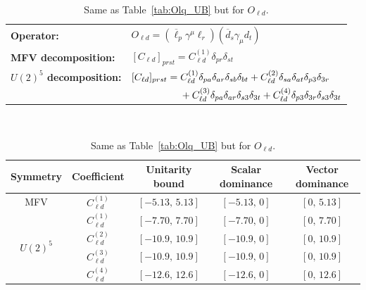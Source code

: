 \begin{table}[htbp]
\centering
{\small
\begin{tabular}{ll}
    \textbf{Operator:} &
        $\boxed{O_{\ell d} = (\overline\ell_p \gamma^\mu \ell_r)(\overline d_s \gamma_\mu d_t)}$ \\[0.2cm]
    \textbf{MFV decomposition:} &
        $[C_{\ell d}]_{prst} = C_{\ell d}^{(1)}\delta_{pr}\delta_{st}$ \\[0.15cm]
    \textbf{$U(2)^5$ decomposition:} &
        $[C_{\ell d}]_{prst} =
            C_{\ell d}^{(1)}\Pij{p}{r}{a}\Pij{s}{t}{b}
            + C_{\ell d}^{(2)}\Pij{s}{t}{a}\delta_{p3}\delta_{3r}$ \\
        & $\phantom{[C_{\ell d}]_{prst} ={}}+ C_{\ell d}^{(3)}\Pij{p}{r}{a}\delta_{s3}\delta_{3t}
            + C_{\ell d}^{(4)}\delta_{p3}\delta_{3r}\delta_{s3}\delta_{3t}$ \\
\end{tabular}
\\[0.3cm]
\renewcommand{\arraystretch}{1.3}
\begin{tabular}{ccccc}
    \toprule
    \rowcolor{hdrcolor}
    \textbf{Symmetry} & \textbf{Coefficient}
        & \textbf{Unitarity bound}
        & \textbf{Scalar dominance}
        & \textbf{Vector dominance} \\
    \midrule
    \multirow{1}{*}{MFV}
        & $C_{\ell d}^{(1)}$ & $[-5.13,\, 5.13]$ & $[-5.13,\, 0]$ & $[0,\, 5.13]$ \\
    \midrule
    \multirow{4}{*}{$U(2)^5$}
        & $C_{\ell d}^{(1)}$ & $[-7.70,\, 7.70]$ & $[-7.70,\, 0]$ & $[0,\, 7.70]$ \\
        & $C_{\ell d}^{(2)}$ & $[-10.9,\, 10.9]$ & $[-10.9,\, 0]$ & $[0,\, 10.9]$ \\
        & $C_{\ell d}^{(3)}$ & $[-10.9,\, 10.9]$ & $[-10.9,\, 0]$ & $[0,\, 10.9]$ \\
        & $C_{\ell d}^{(4)}$ & $[-12.6,\, 12.6]$ & $[-12.6,\, 0]$ & $[0,\, 12.6]$ \\
    \bottomrule
\end{tabular}}
\caption{Same as Table~\ref{tab:Olq_UB} but for $O_{\ell d}$.}
\label{tab:Old_UB}
\end{table}

